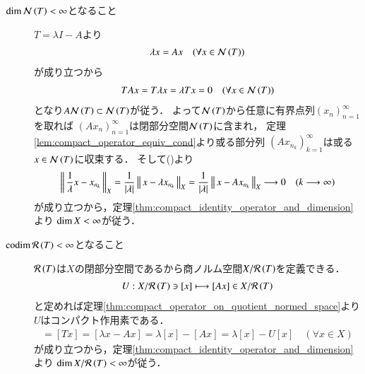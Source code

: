 \begin{prf}
\begin{description}
			\item[$\operatorname{dim} \mathcal{N}\left( T \right) < \infty$となること]	
				$T = \lambda I - A$より
				\begin{align}
					\lambda x = A x \quad (\forall x \in \mathcal{N}\left( T \right))
					\label{eq:thm_Banach_space_compact_operator_kernel_dimension_4}
				\end{align}
				が成り立つから
				\begin{align}
					T A x = T \lambda x = \lambda T x = 0 \quad (\forall x \in \mathcal{N}\left( T \right))
				\end{align}
				となり$A \mathcal{N}\left( T \right) \subset \mathcal{N}\left( T \right)$が従う．
				よって$\mathcal{N}\left( T \right)$から任意に有界点列$(x_n)_{n=1}^{\infty}$を取れば
				$\left(A x_n \right)_{n=1}^{\infty}$は閉部分空間$\mathcal{N}\left( T \right)$に含まれ，
				定理\ref{lem:compact_operator_equiv_cond}より或る部分列
				$\left(A x_{n_k} \right)_{k=1}^{\infty}$は或る$x \in \mathcal{N}\left( T \right)$に収束する．
				そして()より
				\begin{align}
					\left\|\, \frac{1}{\lambda}x - x_{n_k}\, \right\|_{X}
					= \frac{1}{|\lambda|} \left\|\, x - \lambda x_{n_k}\, \right\|_{X}
					= \frac{1}{|\lambda|} \left\|\, x - A x_{n_k}\, \right\|_{X}
					\longrightarrow 0 \quad (k \longrightarrow \infty)
				\end{align}
				が成り立つから，定理\ref{thm:compact_identity_operator_and_dimension}より
				$\operatorname{dim} X < \infty$が従う．
				
			\item[$\operatorname{codim} \mathcal{R}\left( T \right) < \infty$となること]
				$\mathcal{R}\left( T \right)$は$X$の閉部分空間であるから商ノルム空間$X/\mathcal{R}\left( T \right)$を定義できる．
				\begin{align}
					U:X/\mathcal{R}\left( T \right) \ni [x] \longmapsto [Ax] \in X/\mathcal{R}\left( T \right)
				\end{align}
				と定めれば定理\ref{thm:compact_operator_on_quotient_normed_space}より
				$U$はコンパクト作用素である．
				\begin{align}
					[0] = [Tx] = [\lambda x - Ax] = \lambda [x] - [Ax] = \lambda [x] - U[x] \quad (\forall x \in X)
				\end{align}
				が成り立つから，定理\ref{thm:compact_identity_operator_and_dimension}より
				$\operatorname{dim} X/\mathcal{R}\left( T \right) < \infty$が従う．
				\QED
		\end{description}
	\end{prf}
	
	\begin{screen}
		\begin{thm}[Fredholmの交代定理]
			
		\end{thm}
	\end{screen}
	
